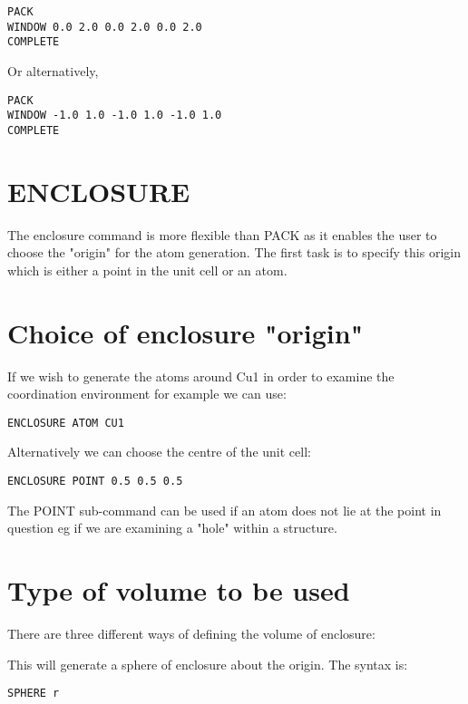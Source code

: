 \documentclass[10pt,a4paper]{report}
\begin{document}
\small\begin{verbatim}
PACK
WINDOW 0.0 2.0 0.0 2.0 0.0 2.0
COMPLETE
\end{verbatim}\normalsize


Or alternatively,
\small\begin{verbatim}
PACK
WINDOW -1.0 1.0 -1.0 1.0 -1.0 1.0
COMPLETE
\end{verbatim}\normalsize


\section{ENCLOSURE}


The enclosure command is more flexible than PACK as it enables
the
user to choose the "origin" for the atom generation. The first
task is
to specify this origin which is either a point in the unit cell
or an
atom.
\section{Choice of enclosure "origin"}


\bigskip{}




If we wish to generate the atoms around Cu1 in order to examine
the
coordination environment for example we can use:
\small\begin{verbatim}
ENCLOSURE ATOM CU1
\end{verbatim}\normalsize




\bigskip{}




Alternatively we can choose the centre of the unit cell:
\small\begin{verbatim}
ENCLOSURE POINT 0.5 0.5 0.5
\end{verbatim}\normalsize


The POINT sub-command can be used if an atom does not lie at the
point in
question eg if we are examining a "hole" within a structure.
\section{Type of volume to be used}


There are three different ways of defining the volume of
enclosure:


\bigskip{}


This will generate a sphere of enclosure about the origin. The
syntax is:
\small\begin{verbatim}
SPHERE r
\end{verbatim}\normalsize
\end{document}
